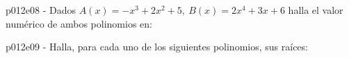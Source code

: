 \documentclass[addpoints,spanish, 12pt,a4paper]{exam}
\begin{document}
\begin{questions}
\begin{multicols}{1}
\begin{parts}
        \end{parts}
        \end{multicols}
        \question p012e08 - Dados $ A(x)= - {x^3} + 2{x^2} + 5, \  B(x)= 2{x^4} + 3x + 6$ halla el valor numérico de ambos polinomios en:
        \begin{multicols}{3} 
        \end{multicols}
        \question p012e09 - Halla, para cada uno  de los siguientes polinomios, sus raíces:
        \begin{multicols}{3} 

\end{multicols}
\end{questions}
\end{document}
